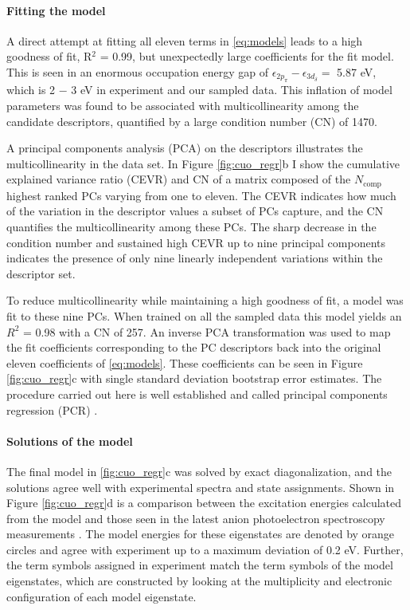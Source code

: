 \documentclass[12pt]{article}
\begin{document}
\vspace{-10pt}
\paragraph{Fitting the model}
A direct attempt at fitting all eleven terms in \eqref{eq:models} leads to a high goodness of fit, R$^2$ = 0.99, but unexpectedly large coefficients for the fit model.
This is seen in an enormous occupation energy gap of $\epsilon_{2p_\pi} - \epsilon_{3d_\delta} = $ 5.87 eV, which is 2 $-$ 3 eV in experiment and our sampled data.
This inflation of model parameters was found to be associated with multicollinearity among the candidate descriptors, quantified by a large condition number (CN) of 1470.

A principal components analysis (PCA) on the descriptors illustrates the multicollinearity in the data set.
In Figure \eqref{fig:cuo_regr}b I show the cumulative explained variance ratio (CEVR) and CN of a matrix composed of the $N_\text{comp}$ highest ranked PCs varying from one to eleven.
The CEVR indicates how much of the variation in the descriptor values a subset of PCs capture, and the CN quantifies the multicollinearity among these PCs.
The sharp decrease in the condition number and sustained high CEVR up to nine principal components indicates the presence of only nine linearly independent variations within the descriptor set.

To reduce multicollinearity while maintaining a high goodness of fit, a model was fit to these nine PCs.
When trained on all the sampled data this model yields an $R^2$ = 0.98 with a CN of 257. 
An inverse PCA transformation was used to map the fit coefficients corresponding to the PC descriptors back into the original eleven coefficients of \eqref{eq:models}.
These coefficients can be seen in Figure \ref{fig:cuo_regr}c with single standard deviation bootstrap error estimates.
The procedure carried out here is well established and called principal components regression (PCR) \cite{10.2307/2348005}.

\vspace{-10pt}
\paragraph{Solutions of the model}
The final model in \ref{fig:cuo_regr}c was solved by exact diagonalization, and the solutions agree well with experimental spectra and state assignments.
Shown in Figure \ref{fig:cuo_regr}d is a comparison between the excitation energies calculated from the model and those seen in the latest anion photoelectron spectroscopy measurements \cite{Wu1997}.
The model energies for these eigenstates are denoted by orange circles and agree with experiment up to a maximum deviation of 0.2 eV.
Further, the term symbols assigned in experiment match the term symbols of the model eigenstates, which are constructed by looking at the multiplicity and electronic configuration of each model eigenstate. 
\end{document}
